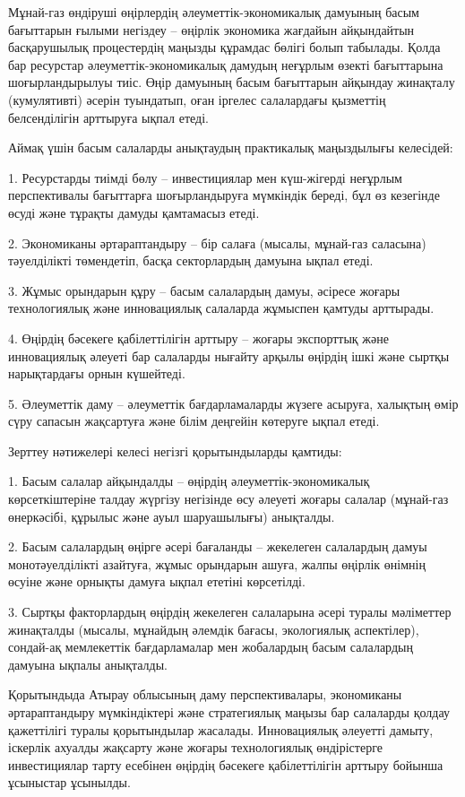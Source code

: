 Мұнай-газ өндіруші өңірлердің әлеуметтік-экономикалық дамуының басым
бағыттарын ғылыми негіздеу -- өңірлік экономика жағдайын айқындайтын
басқарушылық процестердің маңызды құрамдас бөлігі болып табылады. Қолда
бар ресурстар әлеуметтік-экономикалық дамудың неғұрлым өзекті
бағыттарына шоғырландырылуы тиіс. Өңір дамуының басым бағыттарын
айқындау жинақталу (кумулятивті) әсерін туындатып, оған іргелес
салалардағы қызметтің белсенділігін арттыруға ықпал етеді.

Аймақ үшін басым салаларды анықтаудың практикалық маңыздылығы келесідей:

1. Ресурстарды тиімді бөлу -- инвестициялар мен күш-жігерді неғұрлым
перспективалы бағыттарға шоғырландыруға мүмкіндік береді, бұл өз
кезегінде өсуді және тұрақты дамуды қамтамасыз етеді.

2. Экономиканы әртараптандыру -- бір салаға (мысалы, мұнай-газ саласына)
тәуелділікті төмендетіп, басқа секторлардың дамуына ықпал етеді.

3. Жұмыс орындарын құру -- басым салалардың дамуы, әсіресе жоғары
технологиялық және инновациялық салаларда жұмыспен қамтуды арттырады.

4. Өңірдің бәсекеге қабілеттілігін арттыру -- жоғары экспорттық және
инновациялық әлеуеті бар салаларды нығайту арқылы өңірдің ішкі және
сыртқы нарықтардағы орнын күшейтеді.

5. Әлеуметтік даму -- әлеуметтік бағдарламаларды жүзеге асыруға, халықтың
өмір сүру сапасын жақсартуға және білім деңгейін көтеруге ықпал етеді.

Зерттеу нәтижелері келесі негізгі қорытындыларды қамтиды:

1. Басым салалар айқындалды -- өңірдің әлеуметтік-экономикалық
көрсеткіштеріне талдау жүргізу негізінде өсу әлеуеті жоғары салалар
(мұнай-газ өнеркәсібі, құрылыс және ауыл шаруашылығы) анықталды.

2. Басым салалардың өңірге әсері бағаланды -- жекелеген салалардың дамуы
монотәуелділікті азайтуға, жұмыс орындарын ашуға, жалпы өңірлік
өнімнің өсуіне және орнықты дамуға ықпал ететіні көрсетілді.

3. Сыртқы факторлардың өңірдің жекелеген салаларына әсері туралы
мәліметтер жинақталды (мысалы, мұнайдың әлемдік бағасы, экологиялық
аспектілер), сондай-ақ мемлекеттік бағдарламалар мен жобалардың басым
салалардың дамуына ықпалы анықталды.

Қорытындыда Атырау облысының даму перспективалары, экономиканы
әртараптандыру мүмкіндіктері және стратегиялық маңызы бар салаларды
қолдау қажеттілігі туралы қорытындылар жасалады. Инновациялық әлеуетті
дамыту, іскерлік ахуалды жақсарту және жоғары технологиялық өндірістерге
инвестициялар тарту есебінен өңірдің бәсекеге қабілеттілігін арттыру
бойынша ұсыныстар ұсынылды.

